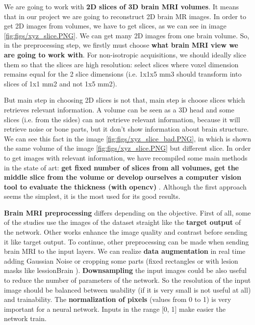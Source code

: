 We are going to work with \textbf{2D slices of 3D brain MRI volumes}. It means that  in our project we are going to reconstruct 2D brain MR images. In order to get 2D images from volumes, we have to get slices, as we can see in image \ref{fig:figs/xyz_slice.PNG}. We can get many 2D images from one brain volume. So, in the  preprocessing step, we firstly must choose \textbf{what brain MRI view we are going to work with}. For non-isotropic acquisitions, we should ideally slice them so that the slices are high resolution: select slices where voxel dimension remains equal for the 2 slice dimensions (i.e. 1x1x5 mm3 should transform into slices of 1x1 mm2 and not 1x5 mm2).

But main step in choosing 2D slices is not that, main step is choose slices which retrieves relevant information. A volume can be seen as a 3D head and some slices (i.e. from the sides) can not retrieve relevant information, because it will retrieve noise or bone parts, but it don't show information about brain structure. We can see this fact in the image \ref{fig:figs/xyz_slice_bad.PNG}, in which is shown the same volume of the image \ref{fig:figs/xyz_slice.PNG} but different slice. In order to get images with relevant information, we have recompiled some main methods in the state of art: \textbf{get fixed number of slices from all volumes, get the middle slice from the volume or develop ourselves a computer vision tool to evaluate the thickness (with opencv)  }. Although the first approach seems the simplest, it is the most used for its good results.




\textbf{Brain MRI preprocessing} differs depending on the objective. First of all, some of the studies use the images of the dataset straight like the \textbf{target output} of the network. Other works enhance the image quality and contrast before sending it like target output. 
To continue, other preprocessing can be made when sending brain MRI to the input layers. We can realize \textbf{data augmentation} in real time adding Gaussian Noise or cropping some parts (fixed rectangles or with lesion masks like lessionBrain \cite{lesionBrain}).
\textbf{Downsampling} the input images could be also useful to reduce the number of parameters of the network. So the resolution of the input image should be balanced between usability (if it is very small is not useful at all) and trainability.  The \textbf{normalization of pixels} (values from 0 to 1) is very important for a neural network.  Inputs in the range [0, 1] make easier the network train.



